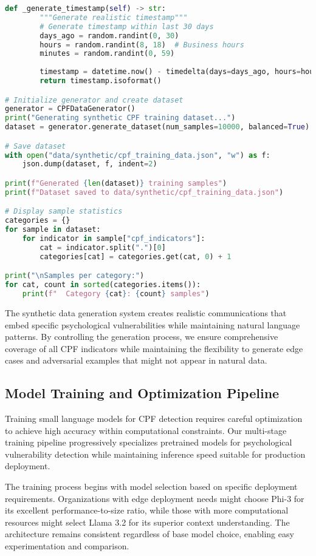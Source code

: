 \documentclass[11pt,a4paper]{article}
\begin{document}
\begin{lstlisting}[language=Python, caption=Synthetic Data Generation System]
    def _generate_timestamp(self) -> str:
        """Generate realistic timestamp"""
        # Generate timestamp within last 30 days
        days_ago = random.randint(0, 30)
        hours = random.randint(8, 18)  # Business hours
        minutes = random.randint(0, 59)
        
        timestamp = datetime.now() - timedelta(days=days_ago, hours=hours, minutes=minutes)
        return timestamp.isoformat()

# Initialize generator and create dataset
generator = CPFDataGenerator()
print("Generating synthetic CPF training dataset...")
dataset = generator.generate_dataset(num_samples=10000, balanced=True)

# Save dataset
with open("data/synthetic/cpf_training_data.json", "w") as f:
    json.dump(dataset, f, indent=2)

print(f"Generated {len(dataset)} training samples")
print(f"Dataset saved to data/synthetic/cpf_training_data.json")

# Display sample statistics
categories = {}
for sample in dataset:
    for indicator in sample["cpf_indicators"]:
        cat = indicator.split(".")[0]
        categories[cat] = categories.get(cat, 0) + 1

print("\nSamples per category:")
for cat, count in sorted(categories.items()):
    print(f"  Category {cat}: {count} samples")
\end{lstlisting}

The synthetic data generation system creates realistic communications that embed specific psychological vulnerabilities while maintaining natural language patterns. By controlling the generation process, we ensure comprehensive coverage of all CPF indicators while maintaining the flexibility to generate edge cases and adversarial examples that might not appear in natural data.

\subsection{Model Training and Optimization Pipeline}

Training small language models for CPF detection requires careful optimization to achieve high accuracy within computational constraints. Our multi-stage training pipeline progressively specializes pretrained models for psychological vulnerability detection while maintaining inference speed suitable for production deployment.

The training process begins with model selection based on specific deployment requirements. Organizations with edge deployment needs might choose Phi-3 for its excellent performance-to-size ratio, while those with more computational resources might select Llama 3.2 for its superior context understanding. The architecture remains consistent regardless of base model choice, enabling easy experimentation and comparison.
\end{document}
